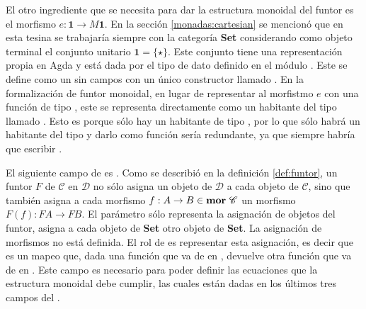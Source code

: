 El otro ingrediente que se necesita para dar la estructura monoidal del funtor es el morfismo $e : \mathbf{1} \rightarrow \mathit{M} \mathbf{1}$. En la sección \ref{monadas:cartesian} se mencionó que en esta tesina se trabajaría siempre con la categoría \textbf{Set} considerando como objeto terminal el conjunto unitario $\mathbf{1} = \{\star\}$. Este conjunto tiene una representación propia en Agda y está dada por el tipo de dato \AgdaDatatype{$\top$} definido en el módulo \href{https://agda.github.io/agda-stdlib/Data.Unit.Base.html}{}. Este se define como un  sin campos con un único constructor llamado . En la formalización de funtor monoidal, en lugar de representar al morfistmo $e$ con una función de tipo \AgdaDatatype{$\top$} \AgdaSymbol{$\rightarrow$}  \AgdaDatatype{$\top$}, este se representa directamente como un habitante del tipo  \AgdaDatatype{$\top$} llamado . Esto es porque sólo hay un habitante de tipo \AgdaDatatype{$\top$}, por lo que sólo habrá un habitante del tipo  \AgdaDatatype{$\top$} y darlo como función sería redundante, ya que siempre habría que escribir  .

El siguiente campo de  es . Como se describió en la definición \ref{def:funtor}, un funtor $\mathit{F}$ de $\mathscr{C}$ en $\mathscr{D}$ no sólo asigna un objeto de $\mathscr{D}$ a cada objeto de $\mathscr{C}$, sino que también asigna a cada morfismo $f : A \rightarrow B \in \text{\bf mor} \ \mathscr{C}$ un morfismo $\mathit{F}(f) : \mathit{F} A \rightarrow \mathit{F} B$. El parámetro  sólo representa la asignación de objetos del funtor, asigna a cada objeto de \textbf{Set} otro objeto de \textbf{Set}. La asignación de morfismos no está definida. El rol de  es representar esta asignación, es decir que es un mapeo que, dada una función que va de  en , devuelve otra función que va de  en . Este campo es necesario para poder definir las ecuaciones que la estructura monoidal debe cumplir, las cuales están dadas en los últimos tres campos del .

